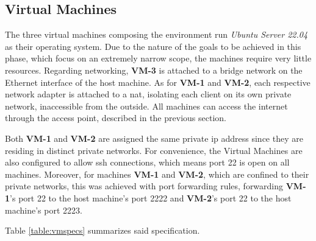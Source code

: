 \documentclass[11pt,twoside,a4paper]{report}
\begin{document}
\subsection{Virtual Machines}

The three virtual machines composing the environment run \emph{Ubuntu Server 22.04} as their operating system. Due to the nature of the goals to be achieved in this phase, which focus on an extremely narrow scope, the machines require very little resources. Regarding networking, \textbf{VM-3} is attached to a bridge network on the Ethernet interface of the host machine. As for \textbf{VM-1} and \textbf{VM-2}, each respective network adapter is attached to a \ac{nat}, isolating each client on its own private network, inaccessible from the outside. All machines can access the internet through the access point, described in the previous section.

Both \textbf{VM-1} and \textbf{VM-2} are assigned the same private \ac{ip} address since they are residing in distinct private networks. For convenience, the Virtual Machines are also configured to allow \ac{ssh} connections, which means port 22 is open on all machines. Moreover, for machines \textbf{VM-1} and \textbf{VM-2}, which are confined to their private networks, this was achieved with port forwarding rules, forwarding \textbf{VM-1}'s port 22 to the host machine's port 2222 and \textbf{VM-2}'s port 22 to the host machine's port 2223.

Table \ref{table:vmspecs} summarizes said specification.

\begin{table}[]
\centering
{}
\caption{Development Virtual Machines specification}
\label{table:vmspecs}
\end{table}
\end{document}
